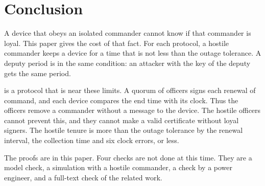 \section{Conclusion}
\label{sec:conclusion}

A device that obeys an isolated commander cannot know if that commander is loyal. This
paper gives the cost of that fact. For each protocol, a hostile commander keeps a device
for a time that is not less than the outage tolerance. A deputy period is in the same
condition: an attacker with the key of the deputy gets the same period.

\sys{} is a protocol that is near these limits. A quorum of officers signs each renewal of
command, and each device compares the end time with its clock. Thus the officers remove a
commander without a message to the device. The hostile officers cannot prevent this, and
they cannot make a valid certificate without loyal signers. The hostile tenure is more than the outage tolerance by the renewal interval,
the collection time and six clock errors, or less.

The proofs are in this paper. Four checks are not done at this time. They are a model
check, a simulation with a hostile commander, a check by a power engineer, and a full-text
check of the related work.
